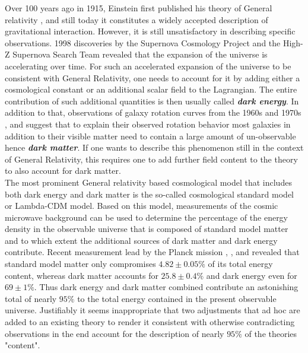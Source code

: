 \documentclass[a4paper,12pt, DIV=14, BCOR=5mm, twoside, headsepline, numbers=noenddot]{scrbook}
\begin{document}
Over 100 years ago in 1915, Einstein first published his theory of General relativity \cite{1915SPAW.......844E}, and still today it constitutes a widely accepted description of gravitational interaction. However, it is still unsatisfactory in describing specific observations. 1998 discoveries by the Supernova Cosmology Project \cite{1999ApJ...517..565P} and the High-Z Supernova Search Team \cite{1998AJ....116.1009R} revealed that the expansion of the universe is accelerating over time. For such an accelerated expansion of the universe to be consistent with General Relativity, one needs to account for it by adding either a cosmological constant or an additional scalar field to the Lagrangian. The entire contribution of such additional quantities is then usually called \textit{\textbf{dark energy}}.
In addition to that, observations of galaxy rotation curves from the 1960s and 1970s \cite{1970ApJ...160..811F}, \cite{1970ApJ...159..379R} and \cite{1980ApJ...238..471R} suggest that to explain their observed rotation behavior most galaxies in addition to their visible matter need to contain a large amount of un-observable hence \textit{\textbf{dark matter}}.
If one wants to describe this phenomenon still in the context of General Relativity, this requires one to add further field content to the theory to also account for dark matter. \\

The most prominent General relativity based cosmological model that includes both dark energy and dark matter is the so-called cosmological standard model or Lambda-CDM model. Based on this model, measurements of the cosmic microwave background can be used to determine the percentage of the energy density in the observable universe that is composed of standard model matter and to which extent the additional sources of dark matter and dark energy contribute. Recent measurement lead by the Planck mission \cite{Planck13_1}, \cite{Planck13_2}, \cite{Planck15} and \cite{Planck18} revealed that standard model matter only compromises $4.82\pm0.05\%$ of its total energy content, whereas dark matter accounts for $ 25.8\pm0.4\%$ and dark energy even for $ 69 \pm 1 \%$. Thus dark energy and dark matter combined contribute an astonishing total of nearly $95 \%$ to the total energy contained in the present observable universe.
Justifiably it seems inappropriate that two adjustments that ad hoc are added to an existing theory to render it consistent with otherwise contradicting observations in the end account for the description of nearly $95\%$ of the theories "content".  \\
\end{document}
